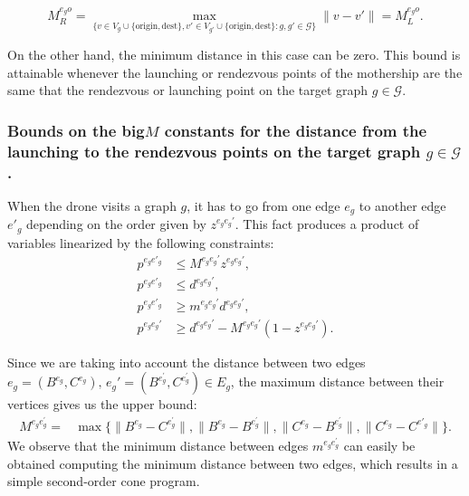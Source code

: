 \documentclass[10pt,a4paper]{elsarticle}
\newcommand{\EN}[1]{{\color{black}#1}}
\begin{document}
$$
M_R^{e_go} = \max_{\{v\in V_g\cup\{\text{origin}, \text{dest}\}, v'\in V_{g'}\cup\{\text{origin}, \text{dest}\} : g, g'\in\mathcal G\}} \|v - v'\| = M_L^{e_go}.
$$

\noindent
On the other hand, the minimum distance in this case can be zero. This bound is attainable whenever the launching or rendezvous points of the mothership are the same that the rendezvous or launching point on the target graph $g\in \mathcal{G}$.



\subsubsection*{Bounds on the big$M$ constants for the distance from the launching to the rendezvous points on the target graph $g\in \mathcal{G}$.} 
\noindent
When the drone visits a graph $g$, it has to go from one edge $e_g$ to another edge $e'_g$ depending on the order given by $z^{e_ge_g'}$. This fact produces a product of variables linearized by the following constraints:
\begin{align*}
p^{e_ge'_g} & \leq M^{e_ge_g'} z^{e_ge_g'}, \\
p^{e_ge'_g} & \leq d^{e_ge_g'}, \\
p^{e_ge'_g} & \geq m^{e_ge_g'} d^{e_ge_g'}, \\
p^{e_ge_g'} & \geq d^{e_ge_g'} - M^{e_ge_g'}(1-z^{e_ge_g'}).
\end{align*}

\noindent
Since we are taking into account the distance between two edges $e_g=(B^{e_g},C^{e_g}), \, e_g'=(B^{e^\prime_g},C^{e^\prime_g})\in E_g$, the maximum distance between their vertices gives us the upper bound:
\begin{align*}
M^{e_g e^\prime_g} = & \max\{\|B^{e_g} - C^{e^\prime_g}\|, \|B^{e_g} - B^{e^\prime_g}\|, \|C^{e_g} - B^{e^\prime_g}\|, \|C^{e_g} - C^{e'_g}\|\}. 
\end{align*}
We observe that the minimum distance between edges $m^{e_g e^\prime_g}$ can \EN{easily be} obtained computing the minimum distance between two edges, which results in a simple second-order cone program.
\end{document}
